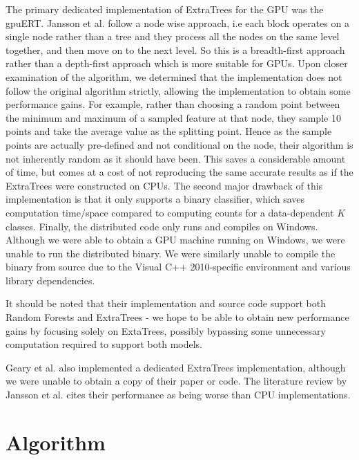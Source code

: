 \documentclass[10pt,conference]{IEEEtran}
\begin{document}
The primary dedicated implementation of ExtraTrees for the GPU was the gpuERT\cite{gpuert}. Jansson et al. follow a node wise approach, i.e each block operates on a single node rather than a tree and they process all the nodes on the same level together, and then move on to the next level. So this is a breadth-first approach rather than a depth-first approach which is more suitable for GPUs. Upon closer examination of the algorithm, we determined that the implementation does not follow the original algorithm strictly, allowing the implementation to obtain some performance gains. For example, rather than choosing a random point between the minimum and maximum of a sampled feature at that node, they sample 10 points and take the average value as the splitting point. Hence as the sample points are actually pre-defined and not conditional on the node, their algorithm is not inherently random as it should have been. This saves a considerable amount of time, but comes at a cost of not reproducing the same accurate results as if the ExtraTrees were constructed on CPUs. The second major drawback of this implementation is that it only supports a binary classifier, which saves computation time/space compared to computing counts for a data-dependent $K$ classes. Finally, the distributed code only runs and compiles on Windows. Although we were able to obtain a GPU machine running on Windows, we were unable to run the distributed binary. We were similarly unable to compile the binary from source due to the Visual C++ 2010-specific environment and various library dependencies. 

It should be noted that their implementation and source code support both Random Forests and ExtraTrees - we hope to be able to obtain new performance gains by focusing solely on ExtaTrees, possibly bypassing some unnecessary computation required to support both models.

Geary et al.\cite{gearyfinal} also implemented a dedicated ExtraTrees implementation, although we were unable to obtain a copy of their paper or code. The literature review by Jansson et al. cites their performance as being worse than CPU implementations.

\section{Algorithm}
\end{document}
